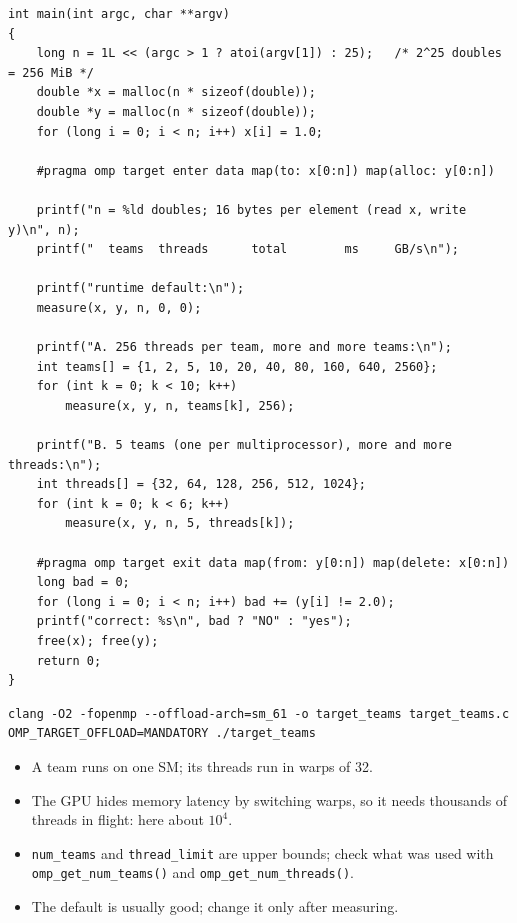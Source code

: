 \documentclass[11pt,a4paper]{article}
\let\origtexttt\texttt
\renewcommand{\texttt}[1]{\textcolor{black!60}{\origtexttt{#1}}}
\begin{document}
\begin{lstlisting}[caption={\textbf{\origtexttt{target\_teams.c}} -- the same kernel launched with different numbers of teams and threads.}, label={lst:teams}]
int main(int argc, char **argv)
{
    long n = 1L << (argc > 1 ? atoi(argv[1]) : 25);   /* 2^25 doubles = 256 MiB */
    double *x = malloc(n * sizeof(double));
    double *y = malloc(n * sizeof(double));
    for (long i = 0; i < n; i++) x[i] = 1.0;

    #pragma omp target enter data map(to: x[0:n]) map(alloc: y[0:n])

    printf("n = %ld doubles; 16 bytes per element (read x, write y)\n", n);
    printf("  teams  threads      total        ms     GB/s\n");

    printf("runtime default:\n");
    measure(x, y, n, 0, 0);

    printf("A. 256 threads per team, more and more teams:\n");
    int teams[] = {1, 2, 5, 10, 20, 40, 80, 160, 640, 2560};
    for (int k = 0; k < 10; k++)
        measure(x, y, n, teams[k], 256);

    printf("B. 5 teams (one per multiprocessor), more and more threads:\n");
    int threads[] = {32, 64, 128, 256, 512, 1024};
    for (int k = 0; k < 6; k++)
        measure(x, y, n, 5, threads[k]);

    #pragma omp target exit data map(from: y[0:n]) map(delete: x[0:n])
    long bad = 0;
    for (long i = 0; i < n; i++) bad += (y[i] != 2.0);
    printf("correct: %s\n", bad ? "NO" : "yes");
    free(x); free(y);
    return 0;
}
\end{lstlisting}

\begin{lstlisting}[style=sh]
clang -O2 -fopenmp --offload-arch=sm_61 -o target_teams target_teams.c
OMP_TARGET_OFFLOAD=MANDATORY ./target_teams
\end{lstlisting}

\begin{keyidea}
\begin{itemize}
  \item A team runs on one SM; its threads run in warps of 32.
  \item The GPU hides memory latency by switching warps, so it needs thousands of threads in
        flight: here about $10^4$.
  \item \texttt{num\_teams} and \texttt{thread\_limit} are upper bounds; check what was used
        with \texttt{omp\_get\_num\_teams()} and \texttt{omp\_get\_num\_threads()}.
  \item The default is usually good; change it only after measuring.
\end{itemize}
\end{keyidea}
\end{document}
